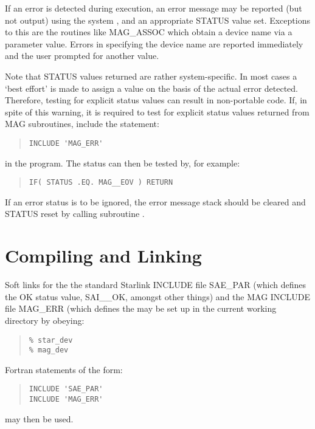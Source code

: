 If an error is detected during execution, an error message may be reported
(but not output) using the  
system , and an appropriate STATUS value set. 
Exceptions to this are the routines like MAG\_ASSOC which obtain a device name 
via a parameter value. Errors in specifying the device name are reported 
immediately and the user prompted for another value.

Note that STATUS values returned are rather system-specific. In most cases a
`best effort' is made to assign a value on the basis of the actual error
detected. Therefore, testing for explicit status values can result in
non-portable code. If, in spite of this warning, it is required to test for
explicit status values returned from MAG subroutines, include the statement:

\small
\begin{quote} \begin{verbatim}
INCLUDE 'MAG_ERR'
\end{verbatim} \end{quote}
\normalsize

in the program. The status can then be tested by, for example:

\small
\begin{quote} \begin{verbatim}
IF( STATUS .EQ. MAG__EOV ) RETURN
\end{verbatim} \end{quote}
\normalsize

If an error status is to be ignored, the error message stack should be
cleared and STATUS reset by calling subroutine
.

\section{Compiling and Linking}
Soft links for the the standard Starlink INCLUDE file SAE\_PAR (which defines
the OK status value, SAI\_\_OK, amongst other things) and the MAG INCLUDE file 
MAG\_ERR (which defines the 
 may be set up in the current 
working directory by obeying:
\small
\begin{quote} \begin{verbatim}
% star_dev
% mag_dev
\end{verbatim} \end{quote}
\normalsize
Fortran statements of the form:
\small
\begin{quote} \begin{verbatim}
INCLUDE 'SAE_PAR'
INCLUDE 'MAG_ERR'
\end{verbatim} \end{quote}
\normalsize
may then be used.

